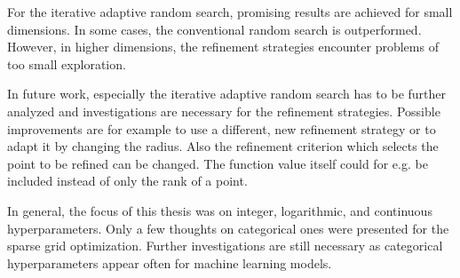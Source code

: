 For the iterative adaptive random search, promising results are achieved for small dimensions. In some cases, the conventional random search is outperformed. However, in higher dimensions, the refinement strategies encounter problems of too small exploration. \newline

In future work, especially the iterative adaptive random search has to be further analyzed and investigations are necessary for the refinement strategies. Possible improvements are for example to use a different, new refinement strategy or to adapt it by changing the radius. Also the refinement criterion which selects the point to be refined can be changed. The function value itself could for e.g. be included instead of only the rank of a point. 

In general, the focus of this thesis was on integer, logarithmic, and continuous hyperparameters. Only a few thoughts on categorical ones were presented for the sparse grid optimization. Further investigations are still necessary as categorical hyperparameters appear often for machine learning models.